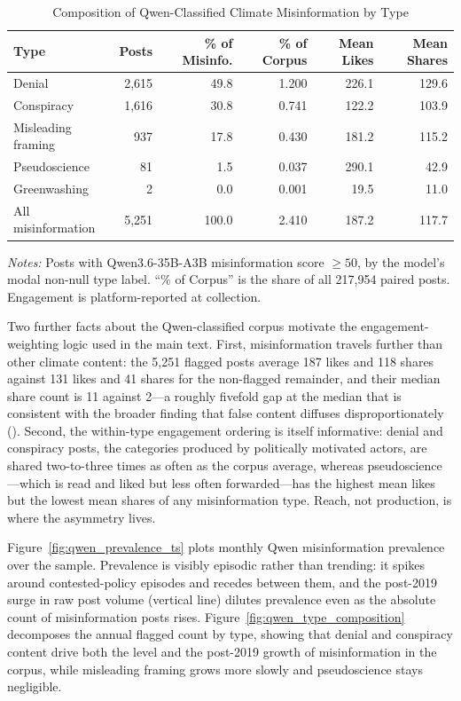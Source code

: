 \documentclass{article}
\theoremstyle{plain}
\begin{document}
\begin{table}[!ht]
\centering
\caption{Composition of Qwen-Classified Climate Misinformation by Type}
\label{tab:qwen_type}
\begin{threeparttable}
\begin{tabularx}{\textwidth}{l R R R R R}
\toprule
Type & Posts & \% of Misinfo. & \% of Corpus & Mean Likes & Mean Shares \\
\midrule
Denial & 2,615 & 49.8 & 1.200 & 226.1 & 129.6 \\
Conspiracy & 1,616 & 30.8 & 0.741 & 122.2 & 103.9 \\
Misleading framing & 937 & 17.8 & 0.430 & 181.2 & 115.2 \\
Pseudoscience & 81 & 1.5 & 0.037 & 290.1 & 42.9 \\
Greenwashing & 2 & 0.0 & 0.001 & 19.5 & 11.0 \\
\midrule
All misinformation & 5,251 & 100.0 & 2.410 & 187.2 & 117.7 \\
\bottomrule
\end{tabularx}
\begin{tablenotes}\small
\item \textit{Notes:} Posts with Qwen3.6-35B-A3B misinformation score $\geq 50$, by the model's modal non-null type label. ``\% of Corpus'' is the share of all 217,954 paired posts. Engagement is platform-reported at collection.
\end{tablenotes}
\end{threeparttable}
\end{table}

Two further facts about the Qwen-classified corpus motivate the engagement-weighting logic used in the main text. First, misinformation travels further than other climate content: the 5,251 flagged posts average 187 likes and 118 shares against 131 likes and 41 shares for the non-flagged remainder, and their median share count is 11 against 2---a roughly fivefold gap at the median that is consistent with the broader finding that false content diffuses disproportionately (\cite{VosoughiRoyAral2018}). Second, the within-type engagement ordering is itself informative: denial and conspiracy posts, the categories produced by politically motivated actors, are shared two-to-three times as often as the corpus average, whereas pseudoscience---which is read and liked but less often forwarded---has the highest mean likes but the lowest mean shares of any misinformation type. Reach, not production, is where the asymmetry lives.

Figure~\ref{fig:qwen_prevalence_ts} plots monthly Qwen misinformation prevalence over the sample. Prevalence is visibly episodic rather than trending: it spikes around contested-policy episodes and recedes between them, and the post-2019 surge in raw post volume (vertical line) dilutes prevalence even as the absolute count of misinformation posts rises. Figure~\ref{fig:qwen_type_composition} decomposes the annual flagged count by type, showing that denial and conspiracy content drive both the level and the post-2019 growth of misinformation in the corpus, while misleading framing grows more slowly and pseudoscience stays negligible.
\end{document}
